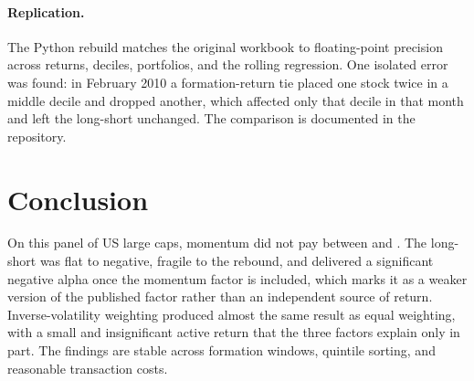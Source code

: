 \documentclass[11pt]{article}
\begin{document}
\paragraph{Replication.}
The Python rebuild matches the original workbook to floating-point precision across returns,
deciles, portfolios, and the rolling regression. One isolated error was found: in February 2010 a
formation-return tie placed one stock twice in a middle decile and dropped another, which affected
only that decile in that month and left the long-short unchanged. The
comparison is documented in the repository.

\section{Conclusion}

On this panel of \nStocks{} US large caps, momentum did not pay between \sampleStart{} and
\sampleEnd{}. The long-short was flat to negative, fragile to the \momMinMonth{} rebound, and
delivered a significant negative alpha once the momentum factor is included, which marks it as a
weaker version of the published factor rather than an independent source of return.
Inverse-volatility weighting produced almost the same result as equal weighting, with a small and
insignificant active return that the three factors explain only in part. The findings are stable
across formation windows, quintile sorting, and reasonable transaction costs.



\end{document}
